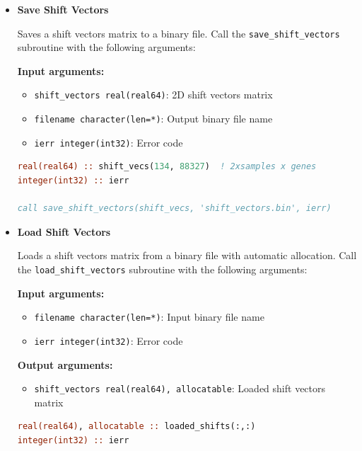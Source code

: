 \documentclass[11pt]{article}
\begin{document}
\begin{enumerate}
\begin{itemize}
\begin{lstlisting}[language=Fortran, caption={Load Family Centroids}]
call load_family_centroids(loaded_centroids, 'centroids.bin', ierr)
	      	      \end{lstlisting}
	      	      
	      	\item \textbf{Save Shift Vectors}
	      	      
	      	      Saves a shift vectors matrix to a binary file. Call the \texttt{save\_shift\_vectors}
	      	      subroutine with the following arguments:
	      	      
	      	      \textbf{Input arguments:}
	      	      \begin{itemize}
	      	      	\item \texttt{shift\_vectors real(real64)}: 2D shift vectors matrix
	      	      	      
	      	      	\item \texttt{filename character(len=*)}: Output binary file name
	      	      	      
	      	      	\item \texttt{ierr integer(int32)}: Error code
	      	      \end{itemize}
	      	      \begin{lstlisting}[language=Fortran, caption={Save Shift Vectors}]
real(real64) :: shift_vecs(134, 88327)  ! 2xsamples x genes
integer(int32) :: ierr

call save_shift_vectors(shift_vecs, 'shift_vectors.bin', ierr)
	      	      \end{lstlisting}
	      	      
	      	\item \textbf{Load Shift Vectors}
	      	      
	      	      Loads a shift vectors matrix from a binary file with automatic allocation.
	      	      Call the \texttt{load\_shift\_vectors} subroutine with the following arguments:
	      	      
	      	      \textbf{Input arguments:}
	      	      \begin{itemize}
	      	      	\item \texttt{filename character(len=*)}: Input binary file name
	      	      	      
	      	      	\item \texttt{ierr integer(int32)}: Error code
	      	      \end{itemize}
	      	      \textbf{Output arguments:}
	      	      \begin{itemize}
	      	      	\item \texttt{shift\_vectors real(real64), allocatable}: Loaded shift
	      	      	      vectors matrix
	      	      \end{itemize}
	      	      \begin{lstlisting}[language=Fortran, caption={Load Shift Vectors}]
real(real64), allocatable :: loaded_shifts(:,:)
integer(int32) :: ierr


\end{lstlisting}
\end{itemize}
\end{enumerate}
\end{document}
